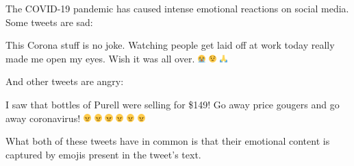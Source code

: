 \documentclass[11pt]{article}
\newcommand{\fixme}[1]{{\color{red} \textbf{FIXME:} {\textit {#1}}}}
\begin{document}
The COVID-19 pandemic has caused intense emotional reactions on social media.
Some tweets are sad:
\begin{displayquote}
    This Corona stuff is no joke. Watching people get laid off at work today really made me open my eyes. Wish it was all over. 
    \includegraphics[height=0.8em]{images/loudly-crying-face_1f62d} 
    \includegraphics[height=0.8em]{images/anguished-face_1f627}
    \includegraphics[height=0.8em]{images/folded-hands_1f64f}
\end{displayquote}
And other tweets are angry:
\begin{displayquote}
    I saw that bottles of Purell were selling for \$149! Go away price gougers and go away coronavirus! 
    \includegraphics[height=0.8em]{images/angry-face_1f620.png}
    \includegraphics[height=0.8em]{images/angry-face_1f620.png}
    \includegraphics[height=0.8em]{images/angry-face_1f620.png}
    \includegraphics[height=0.8em]{images/angry-face_1f620.png}
    \includegraphics[height=0.8em]{images/angry-face_1f620.png}
    \includegraphics[height=0.8em]{images/angry-face_1f620.png}
\end{displayquote}
What both of these tweets have in common is that their emotional content is captured by emojis present in the tweet's text.
\end{document}

